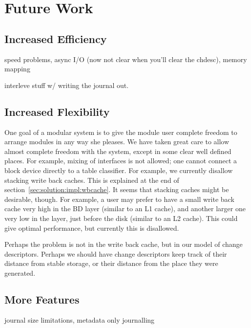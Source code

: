 \section{Future Work}
\label{sec:future}

\subsection{Increased Efficiency}
speed problems, async I/O (now not clear when you'll clear the
chdesc), memory mapping

interleve stuff w/ writing the journal out.

\subsection{Increased Flexibility}

One goal of a modular system is to give the module user complete
freedom to arrange modules in any way she pleases. We have taken great
care to allow almost complete freedom with the system, except in some
clear well defined places. For example, mixing of interfaces is not
allowed; one cannot connect a block device directly to a table
classifier. For example, we currently disallow stacking write back
caches. This is explained at the end of
section~\ref{sec:solution:impl:wbcache}. It seems that stacking caches
might be desirable, though. For example, a user may prefer to have a
small write back cache very high in the BD layer (similar to an L1
cache), and another larger one very low in the layer, just before the
disk (similar to an L2 cache). This could give optimal performance,
but currently this is disallowed.

Perhaps the problem is not in the write back cache, but in our model
of change descriptors. Perhaps we should have change descriptors keep
track of their distance from stable storage, or their distance from
the place they were generated.

\subsection{More Features}
journal size limitations, metadata only journalling
